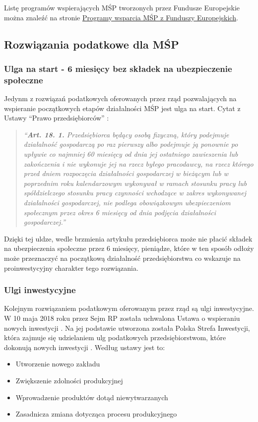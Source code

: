 \documentclass[11pt]{article}
\newenvironment{itquote}
  {\begin{quote} \begin{center}\itshape}
  {\end{center}  \end{quote}   \ignorespacesafterend}
\begin{document}
Listę programów wspierających MŚP tworzonych przez Fundusze Europejskie można znaleźć na stronie 
\href{https://www.funduszeeuropejskie.gov.pl/wyszukiwarka/mikro-male-i-srednie-przedsiebiorstwa/}{Programy wsparcia MŚP z Funduszy Europejskich}.

\subsection*{Rozwiązania podatkowe dla MŚP}

\subsubsection*{Ulga na start - 6 miesięcy bez składek na ubezpieczenie społeczne}

Jedynm z rozwiązań podatkowych oferowanych przez rząd pozwalających na wspieranie początkowych etapów działalności MŚP jest ulga na start.
Cytat z Ustawy ``Prawo przedsiębiorców'' \cite{PrawoPrzedsiębiorców}:

\begin{itquote}
  ``\textbf{Art. 18. 1.} Przedsiębiorca będący osobą fizyczną, który podejmuje działalność
  gospodarczą po raz pierwszy albo podejmuje ją ponownie po upływie co najmniej
  60 miesięcy od dnia jej ostatniego zawieszenia lub zakończenia i nie wykonuje jej na
  rzecz byłego pracodawcy, na rzecz którego przed dniem rozpoczęcia działalności
  gospodarczej w bieżącym lub w poprzednim roku kalendarzowym wykonywał
  w ramach stosunku pracy lub spółdzielczego stosunku pracy czynności wchodzące
  w zakres wykonywanej działalności gospodarczej, nie podlega obowiązkowym
  ubezpieczeniom społecznym przez okres 6 miesięcy od dnia podjęcia działalności
  gospodarczej.''
\end{itquote}

Dzięki tej uldze, wedle brzmienia artykułu przedsiębiorca może nie płacić składek na ubezpieczenia społeczne
przez 6 miesięcy, pieniądze, które w ten sposób odłoży może przeznaczyć na początkową działalność przedsiębiorstwa co
wskazuje na proinwestycyjny charakter tego rozwiązania.

\subsubsection*{Ulgi inwestycyjne}

Kolejnym rozwiązaniem podatkowym oferowanym przez rząd są ulgi inwestycyjne.
W 10 maja 2018 roku przez Sejm RP została uchwalona Ustawa o wspieraniu nowych inwestycji \cite{UstawaOInwestycjach}.
Na jej podstawie utworzona została Polska Strefa Inwestycji, która zajmuje się udzielaniem ulg podatkowych przedsiębiorstwom,
które dokonują nowych inwestycji \cite{PolskaStrefaInwestycji}. Według ustawy jest to:
\begin{itemize}
  \item Utworzenie nowego zakładu
  \item Zwiększenie zdolności produkcyjnej
  \item Wprowadzenie produktów dotąd niewytwarzanych
  \item Zasadnicza zmiana dotycząca procesu produkcyjnego
\end{itemize}
\end{document}
